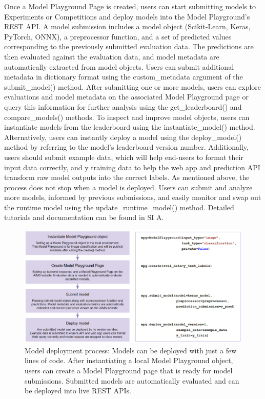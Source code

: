 Once a Model Playground Page is created, users can start submitting models to Experiments or Competitions and deploy models into the Model Playground’s REST API. A model submission includes a model object (Scikit-Learn, Keras, PyTorch, ONNX), a preprocessor function, and a set of predicted values corresponding to the previously submitted evaluation data. The predictions are then evaluated against the evaluation data, and model metadata are automatically extracted from model objects. Users can submit additional metadata in dictionary format using the custom\_metadata argument of the submit\_model() method. After submitting one or more models, users can explore evaluations and model metadata on the associated Model Playground page or query this information for further analysis using the get\_leaderboard() and compare\_models() methods. To inspect and improve model objects, users can instantiate models from the leaderboard using the instantiate\_model() method. Alternatively, users can instantly deploy a model using the deploy\_model() method by referring to the model’s leaderboard version number. Additionally, users should submit example data, which will help end-users to format their input data correctly, and y training data to help the web app and prediction API transform raw model outputs into the correct labels. As mentioned above, the process does not stop when a model is deployed. Users can submit and analyze more models, informed by previous submissions, and easily monitor and swap out the runtime model using the update\_runtime\_model() method. Detailed tutorials and documentation can be found in SI A.

\begin{figure}
  \centering
  \includegraphics[width=1\textwidth]{figures/fig_aims_code_new.png}
  \caption{Model deployment process: Models can be deployed with just a few lines of code. After instantiating a local Model Playground object, users can create a Model Playground page that is ready for model submissions. Submitted models are automatically evaluated and can be deployed into live REST APIs.}
  \label{fig:fig_code_example}
\end{figure}

